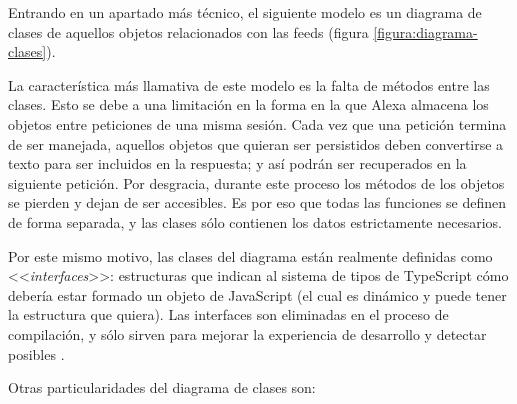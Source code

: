 \documentclass[11pt,spanish,listoffigures,listoftables,table,hyphens,dvipsnames]{tfgetsinf}
\newcommand{\fe}[1]{\foreign{english}{#1}}
\begin{document}
Entrando en un apartado más técnico, el siguiente modelo es un diagrama de clases de aquellos objetos relacionados con las feeds (figura \ref{figura:diagrama-clases}).

La característica más llamativa de este modelo es la falta de métodos entre las clases. Esto se debe a una limitación en la forma en la que Alexa almacena los objetos entre peticiones de una misma sesión. Cada vez que una petición termina de ser manejada, aquellos objetos que quieran ser persistidos deben convertirse a texto para ser incluidos en la respuesta; y así podrán ser recuperados en la siguiente petición. Por desgracia, durante este proceso los métodos de los objetos se pierden y dejan de ser accesibles. Es por eso que todas las funciones se definen de forma separada, y las clases sólo contienen los datos estrictamente necesarios.

Por este mismo motivo, las clases del diagrama están realmente definidas como <<\emph{interfaces}>>: estructuras que indican al sistema de tipos de TypeScript cómo debería estar formado un objeto de JavaScript (el cual es dinámico y puede tener la estructura que quiera). Las interfaces son eliminadas en el proceso de compilación, y sólo sirven para mejorar la experiencia de desarrollo y detectar posibles \fe{bugs}.

Otras particularidades del diagrama de clases son:
\end{document}
